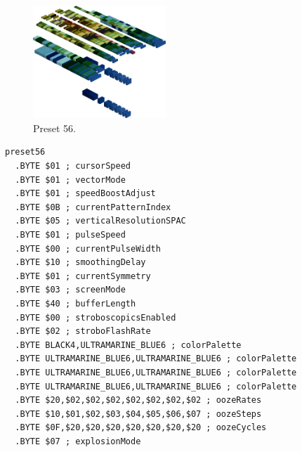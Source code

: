 \vspace*{-0.5cm}
\begin{minipage}[b]{0.48\linewidth}
\begin{figure}[H]                                                          
  \centering                                                             
  \begin{adjustbox}{width=5cm,center}                                   
  \includegraphics[width=5cm]{src/colorspace_presets/preset56-45.png}%
  \end{adjustbox}                                                        
\caption*{Preset 56.}                                           
\end{figure}                                                               
\end{minipage}
\hspace{0.1cm}
\begin{minipage}[b]{0.48\linewidth}                                                                         
\begin{lstlisting}[basicstyle=\ttfamily\tiny]
preset56
  .BYTE $01 ; cursorSpeed
  .BYTE $01 ; vectorMode
  .BYTE $01 ; speedBoostAdjust
  .BYTE $0B ; currentPatternIndex
  .BYTE $05 ; verticalResolutionSPAC
  .BYTE $01 ; pulseSpeed
  .BYTE $00 ; currentPulseWidth
  .BYTE $10 ; smoothingDelay
  .BYTE $01 ; currentSymmetry
  .BYTE $03 ; screenMode
  .BYTE $40 ; bufferLength
  .BYTE $00 ; stroboscopicsEnabled
  .BYTE $02 ; stroboFlashRate
  .BYTE BLACK4,ULTRAMARINE_BLUE6 ; colorPalette
  .BYTE ULTRAMARINE_BLUE6,ULTRAMARINE_BLUE6 ; colorPalette
  .BYTE ULTRAMARINE_BLUE6,ULTRAMARINE_BLUE6 ; colorPalette
  .BYTE ULTRAMARINE_BLUE6,ULTRAMARINE_BLUE6 ; colorPalette
  .BYTE $20,$02,$02,$02,$02,$02,$02,$02 ; oozeRates
  .BYTE $10,$01,$02,$03,$04,$05,$06,$07 ; oozeSteps
  .BYTE $0F,$20,$20,$20,$20,$20,$20,$20 ; oozeCycles
  .BYTE $07 ; explosionMode
\end{lstlisting}
\end{minipage}


